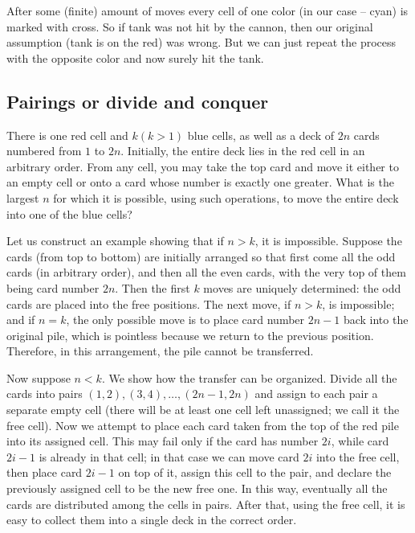 After some (finite) amount of moves every cell of one color (in our case -- cyan) is marked with cross. So if tank was not hit by the cannon, then our original assumption (tank is on the red) was wrong. But we can just repeat the process with the opposite color and now surely hit the tank.

\subsection{Pairings or divide and conquer}

\begin{example}


\end{example}

\begin{example} [Russia 2002]
There is one red cell and $k (k > 1)$ blue cells, as well as a deck of $2n$ cards numbered from $1$ to $2n$. Initially, the entire deck lies in the red cell in an arbitrary order. From any cell, you may take the top card and move it either to an empty cell or onto a card whose number is exactly one greater. What is the largest $n$ for which it is possible, using such operations, to move the entire deck into one of the blue cells?
\end{example}
\sol
Let us construct an example showing that if $n > k$, it is impossible.  
Suppose the cards (from top to bottom) are initially arranged so that first come all the odd cards (in arbitrary order), and then all the even cards, with the very top of them being card number $2n$. Then the first $k$ moves are uniquely determined: the odd cards are placed into the free positions. The next move, if $n > k$, is impossible; and if $n = k$, the only possible move is to place card number $2n-1$ back into the original pile, which is pointless because we return to the previous position. Therefore, in this arrangement, the pile cannot be transferred.

Now suppose $n < k$. We show how the transfer can be organized.  
Divide all the cards into pairs $(1, 2), (3, 4), \ldots, (2n-1, 2n)$ and assign to each pair a separate empty cell (there will be at least one cell left unassigned; we call it the free cell). Now we attempt to place each card taken from the top of the red pile into its assigned cell. This may fail only if the card has number $2i$, while card $2i-1$ is already in that cell; in that case we can move card $2i$ into the free cell, then place card $2i-1$ on top of it, assign this cell to the pair, and declare the previously assigned cell to be the new free one. In this way, eventually all the cards are distributed among the cells in pairs. After that, using the free cell, it is easy to collect them into a single deck in the correct order.

